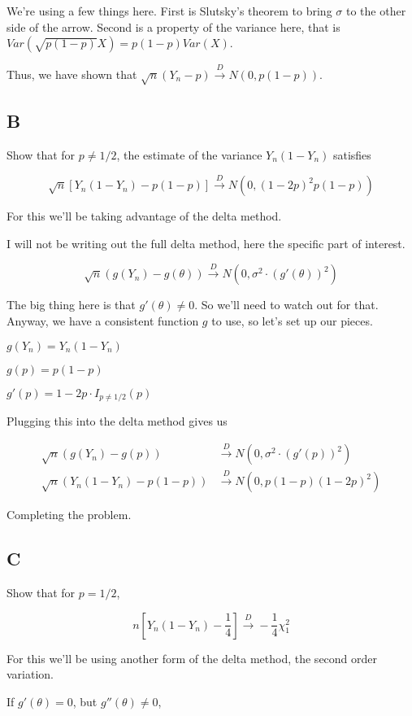 We're using a few things here. First is Slutsky's theorem to bring $\sigma$ to the other side of the arrow. Second is a property of the variance here, that is $Var(\sqrt{p(1-p)}X) = p(1-p)Var(X)$.

Thus, we have shown that  $\sqrt{n}(Y_n - p) \xrightarrow{D} N(0, p(1-p))$.

\subsection*{B}

Show that for $p\neq 1/2$, the estimate of the variance $Y_n(1-Y_n)$ satisfies

\[
	\sqrt{n}[Y_n(1-Y_n) - p(1-p)] \xrightarrow{D} N(0, (1-2p)^2 p(1-p))
\]

For this we'll be taking advantage of the delta method.

I will not be writing out the full delta method, here the specific part of interest. 

\[
	\sqrt{n}(g(Y_n) - g(\theta)) \xrightarrow{D} N(0, \sigma^2 \cdot (g'(\theta))^2) 
\]

The big thing here is that $g'(\theta) \neq 0$. So we'll need to watch out for that. Anyway, we have a consistent function $g$ to use, so let's set up our pieces.

$g(Y_n) = Y_n(1-Y_n)$

$g(p) = p(1-p)$

$g'(p) = 1-2p \cdot I_{p\neq 1/2}(p)$

Plugging this into the delta method gives us

\begin{align*}
	\sqrt{n}(g(Y_n) - g(p)) &\xrightarrow{D} N(0, \sigma^2 \cdot (g'(p))^2) \\
	\sqrt{n}(Y_n(1-Y_n) - p(1-p)) &\xrightarrow{D} N(0, p(1-p) (1-2p)^2)
\end{align*}

Completing the problem.

\subsection*{C}

Show that for $p=1/2$, 

\[n\left[Y_n(1-Y_n) - \frac{1}{4}\right] \xrightarrow{D} -\frac{1}{4} \chi^2_1\]

For this we'll be using another form of the delta method, the second order variation. 

If $g'(\theta) = 0$, but $g''(\theta) \neq 0$, 

